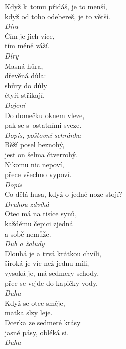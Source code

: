 \begin{multicols}{\value{columnsthindata}}
\noindent
Když k~tomu přidáš, je to menší,\\
když od toho odebereš, je to větší.\\[1 mm]
{\sl Díra}\\

\noindent
Čím je jich více,\\
tím méně váží.\\[1 mm]
{\sl Díry}\\

\noindent
Masná hůra,\\
dřevěná důla:\\
shůry do důly\\
čtyři stříkají.\\[1 mm]
{\sl Dojení}\\

\noindent
Do domečku oknem vleze,\\
pak se s~ostatními sveze.\\[1 mm]
{\sl Dopis, poštovní schránka}\\

\noindent
Běží posel beznohý,\\
jest on šelma čtverrohý.\\
Nikomu nic nepoví,\\
přece všechno vypoví.\\[1 mm]
{\sl Dopis}\\

\noindent
Co dělá husa, když o jedné noze stojí?\\[1 mm]
{\sl Druhou zdvíhá}\\

\noindent
Otec má na tisíce synů,\\
každému čepici zjedná\\
a sobě nemůže.\\[1 mm]
{\sl Dub a žaludy}\\

\noindent
Dlouhá je a trvá krátkou chvíli,\\
široká je víc než jednu míli,\\
vysoká je, má sedmery schody,\\
přec se vejde do kapičky vody.\\[1 mm]
{\sl Duha}\\

\noindent
Když se otec směje,\\
matka slzy leje.\\
Dcerka ze sedmeré krásy\\
jasné pásy, obléká si.\\[1 mm]
{\sl Duha}\\


\end{multicols}
